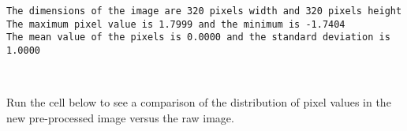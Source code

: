 \documentclass[11pt]{article}
\begin{document}
    \begin{Verbatim}[commandchars=\\\{\}]
The dimensions of the image are 320 pixels width and 320 pixels height
The maximum pixel value is 1.7999 and the minimum is -1.7404
The mean value of the pixels is 0.0000 and the standard deviation is 1.0000

    \end{Verbatim}

    \begin{center}
    \end{center}
    { \hspace*{\fill} \\}
    
    Run the cell below to see a comparison of the distribution of pixel
values in the new pre-processed image versus the raw image.
\end{document}
